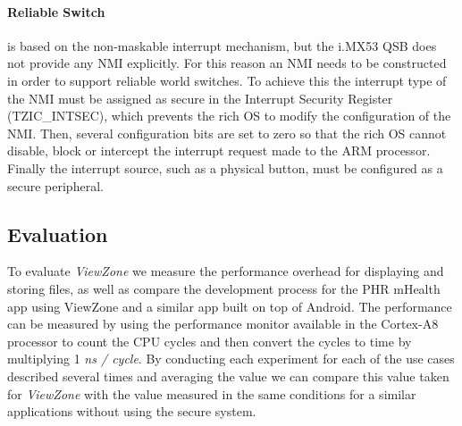 \paragraph{Reliable Switch} is based on the non-maskable interrupt mechanism, but the i.MX53 QSB does not provide any \ac{NMI} explicitly. For this reason an \ac{NMI} needs to be constructed in order to support reliable world switches. To achieve this the interrupt type of the \ac{NMI} must be assigned as secure in the Interrupt Security Register (TZIC\_INTSEC), which prevents the rich OS to modify the configuration of the \ac{NMI}. Then, several configuration bits are set to zero so that the rich OS cannot disable, block or intercept the interrupt request made to the ARM processor. Finally the interrupt source, such as a physical button, must be configured as a secure peripheral.


\subsection{Evaluation}


To evaluate \emph{ViewZone} we measure the performance overhead for displaying and storing files, as well as compare the development process for the PHR mHealth app using ViewZone and a similar app built on top of Android. The performance can be measured by using the performance monitor available in the Cortex-A8 processor to count the CPU cycles and then convert the cycles to time by multiplying 1 \emph{ns / cycle}. By conducting each experiment for each of the use cases described several times and averaging the value we can compare this value taken for \emph{ViewZone} with the value measured in the same conditions for a similar applications without using the secure system.



